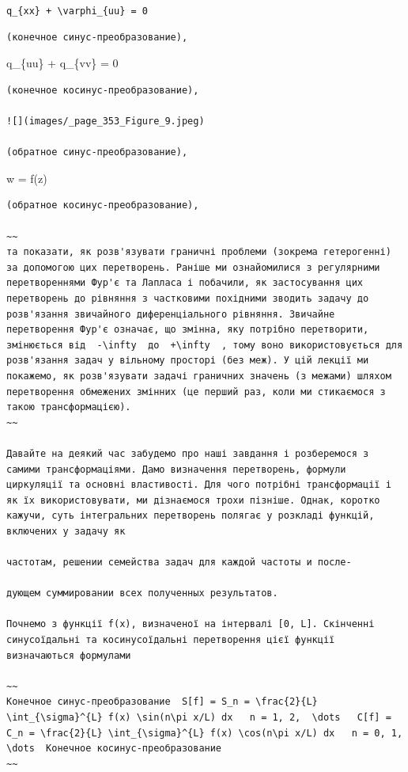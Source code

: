 \documentclass[
  ukrainian,
]{article}
\begin{document}
\texttt{q\_\{xx\}\ +\ \textbackslash{}varphi\_\{uu\}\ =\ 0}

\begin{verbatim}
(конечное синус-преобразование),
\end{verbatim}

q\_\{uu\} + q\_\{vv\} = 0

\begin{verbatim}
(конечное косинус-преобразование),

![](images/_page_353_Figure_9.jpeg)

(обратное синус-преобразование),
\end{verbatim}

w = f(z)

\begin{verbatim}
(обратное косинус-преобразование),

~~
та показати, як розв'язувати граничні проблеми (зокрема гетерогенні) за допомогою цих перетворень. Раніше ми ознайомилися з регулярними перетвореннями Фур'є та Лапласа і побачили, як застосування цих перетворень до рівняння з частковими похідними зводить задачу до розв'язання звичайного диференціального рівняння. Звичайне перетворення Фур'є означає, що змінна, яку потрібно перетворити, змінюється від  -\infty  до  +\infty  , тому воно використовується для розв'язання задач у вільному просторі (без меж). У цій лекції ми покажемо, як розв'язувати задачі граничних значень (з межами) шляхом перетворення обмежених змінних (це перший раз, коли ми стикаємося з такою трансформацією).
~~

Давайте на деякий час забудемо про наші завдання і розберемося з самими трансформаціями. Дамо визначення перетворень, формули циркуляції та основні властивості. Для чого потрібні трансформації і як їх використовувати, ми дізнаємося трохи пізніше. Однак, коротко кажучи, суть інтегральних перетворень полягає у розкладі функцій, включених у задачу як

частотам, решении семейства задач для каждой частоты и после-

дующем суммировании всех полученных результатов.

Почнемо з функції f(x), визначеної на інтервалі [0, L]. Скінченні синусоїдальні та косинусоїдальні перетворення цієї функції визначаються формулами

~~
Конечное синус-преобразование  S[f] = S_n = \frac{2}{L} \int_{\sigma}^{L} f(x) \sin(n\pi x/L) dx   n = 1, 2,  \dots   C[f] = C_n = \frac{2}{L} \int_{\sigma}^{L} f(x) \cos(n\pi x/L) dx   n = 0, 1, \dots  Конечное косинус-преобразование
~~


\end{verbatim}
\end{document}
